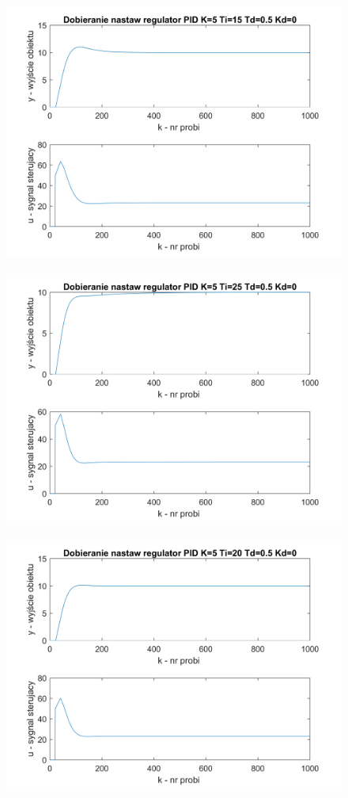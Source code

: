 \documentclass[12pt, a4paper]{article}
\begin{document}
\begin{figure}[H]
	\centering
	\includegraphics[width=0.9\linewidth]{pid_2.png}
	\caption{}
\end{figure}

\begin{figure}[H]
	\centering
	\includegraphics[width=0.9\linewidth]{pid_3.png}
	\caption{}
\end{figure}

\begin{figure}[H]
	\centering
	\includegraphics[width=0.9\linewidth]{pid_4.png}
	\caption{}
\end{figure}
\end{document}
